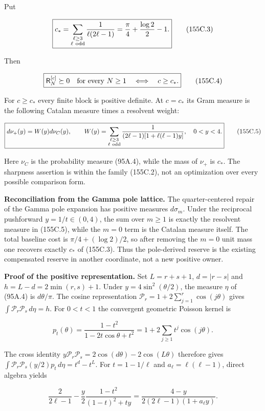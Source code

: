 \documentclass[
  11pt,
]{book}
\begin{document}
Put

\[
\boxed{c_*=
\sum_{\substack{\ell\ge3\\\ell\ {\rm odd}}}\frac1{\ell(2\ell-1)}
=\frac\pi4+\frac{\log2}{2}-1.}
\tag{155C.3}
\]

Then

\[
\boxed{\mathsf R_N^{[c]}\succeq0\quad\hbox{for every }N\ge1
\quad\Longleftrightarrow\quad c\ge c_*.}
\tag{155C.4}
\]

For \(c\ge c_*\) every finite block is positive definite. At \(c=c_*\)
its Gram measure is the following Catalan measure times a resolvent
weight:

\[
\boxed{d\nu_+(y)=W(y)d\nu_C(y),\qquad
W(y)=\sum_{\substack{\ell\ge3\\\ell\ {\rm odd}}}
\frac1{(2\ell-1)[1+\ell(\ell-1)y]},\quad0<y<4.}
\tag{155C.5}
\]

Here \(\nu_C\) is the probability measure (95A.4), while the mass of
\(\nu_+\) is \(c_*\). The sharpness assertion is within the family
(155C.2), not an optimization over every possible comparison form.

\textbf{Reconciliation from the Gamma pole lattice.} The
quarter-centered repair of the Gamma pole expansion has positive
measures \(d\sigma_m\). Under the reciprocal pushforward
\(y=1/t\in(0,4)\), the sum over \(m\ge1\) is exactly the resolvent
measure in (155C.5), while the \(m=0\) term is the Catalan measure
itself. The total baseline cost is \(\pi/4+(\log2)/2\), so after
removing the \(m=0\) unit mass one recovers exactly \(c_*\) of (155C.3).
Thus the pole-derived reserve is the existing compensated reserve in
another coordinate, not a new positive owner.

\textbf{Proof of the positive representation.} Set \(L=r+s+1\),
\(d=|r-s|\) and \(h=L-d=2\min(r,s)+1\). Under \(y=4\sin^2(\theta/2)\),
the measure \(\eta\) of (95A.4) is \(d\theta/\pi\). The cosine
representation \(\mathcal P_r=1+2\sum_{j=1}^r\cos(j\theta)\) gives
\(\int\mathcal P_r\mathcal P_s\,d\eta=h\). For \(0<t<1\) the convergent
geometric Poisson kernel is

\[
p_t(\theta)=\frac{1-t^2}{1-2t\cos\theta+t^2}
=1+2\sum_{j\ge1}t^j\cos(j\theta).
\]

The cross identity
\(y\mathcal P_r\mathcal P_s=2\cos(d\theta)-2\cos(L\theta)\) therefore
gives \(\int\mathcal P_r\mathcal P_s(y/2)p_t\,d\eta=t^d-t^L\). For
\(t=1-1/\ell\) and \(a_\ell=\ell(\ell-1)\), direct algebra yields

\[
\frac2{2\ell-1}-\frac y2
\frac{1-t^2}{(1-t)^2+ty}
=\frac{4-y}{2(2\ell-1)(1+a_\ell y)}.
\tag{155C.6}
\]
\end{document}
